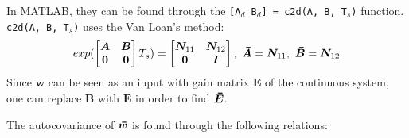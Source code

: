 In MATLAB, they can be found through the
\texttt{[A$_d$\ B$_d$] = c2d(A, B, T$_s$)} function. \\ \texttt{c2d(A, B, T$_s$)} uses the Van Loan's method:
\begin{equation}
exp(
\begin{bmatrix}
\bm{A} & \bm{B} \\
\bm{0} & \bm{0} \\
\end{bmatrix}
T_s) = 
\begin{bmatrix}
\bm{N}_{11} & \bm{N}_{12} \\
\bm{0} & \bm{I} \\
\end{bmatrix}
,\ \thickbar{\bm{A}} = \bm{N}_{11},\  \thickbar{\bm{B}} = \bm{N}_{12}
\end{equation}
Since $\bm{w}$ can be seen as an input with gain matrix $\bm{E}$ of the continuous system, one can replace $\bm{B}$ with $\bm{E}$ in order to find $\thickbar{\bm{E}}$.

The autocovariance of $\thickbar{\bm{w}}$ is found through the following relations:

